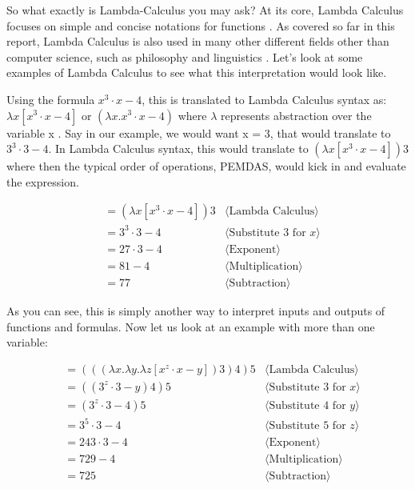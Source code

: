 \documentclass{article}
\begin{document}
\medskip\noindent
So what exactly is Lambda-Calculus you may ask? At its core, Lambda Calculus focuses on simple and concise notations for functions \cite{Lambda Calculus}. As covered so far in this report, Lambda Calculus is also used in many other different fields other than computer science, such as philosophy and linguistics \cite{Lambda Calculus}. Let's look at some examples of Lambda Calculus to see what this interpretation would look like.

\medskip\noindent
Using the formula $x^3 \cdot x-4$, this is translated to Lambda Calculus syntax as: $\lambda x[x^3 \cdot x-4]$ or $(\lambda x.   x^3 \cdot x-4)$ where $\lambda$ represents abstraction over the variable x \cite{Lambda Calculus}. Say in our example, we would want x = 3, that would translate to $3^3 \cdot 3-4$. In Lambda Calculus syntax, this would translate to $(\lambda x[x^3 \cdot x-4])$3 where then the typical order of operations, PEMDAS, would kick in and evaluate the expression. 

\begin{align}
&=(\lambda x[x^3 \cdot x-4])3 
    &\langle\text{Lambda Calculus}\rangle \\
&= 3^3 \cdot 3-4
   &\langle \text{Substitute 3 for } x\rangle \\
&= 27 \cdot 3-4
   &\langle\text{Exponent}\rangle \\
&= 81 - 4
   &\langle\text{Multiplication}\rangle \\
&= 77
   &\langle\text{Subtraction}\rangle
\end{align}

\noindent
As you can see, this is simply another way to interpret inputs and outputs of functions and formulas. Now let us look at an example with more than one variable:

\begin{align}
&=(((\lambda x.\lambda y.\lambda z [x^z \cdot x-y])3)4)5
    &\langle\text{Lambda Calculus}\rangle \\
&= ((3^z \cdot 3-y)4)5
   &\langle \text{Substitute 3 for } x\rangle \\
&= (3^z \cdot 3-4)5
   &\langle \text{Substitute 4 for } y\rangle \\
&= 3^5 \cdot 3-4
   &\langle \text{Substitute 5 for } z\rangle \\
&= 243 \cdot 3-4
   &\langle\text{Exponent}\rangle \\
&= 729 - 4
   &\langle\text{Multiplication}\rangle \\
&= 725
   &\langle\text{Subtraction}\rangle
\end{align}
\end{document}
